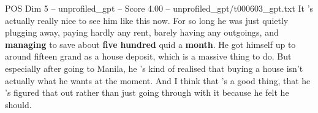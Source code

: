 \begin{textsample}{POS Dim 5 – unprofiled\_gpt – Score 4.00 – unprofiled\_gpt/t000603\_gpt.txt}  \label{ex:f5_pos_035}
It 's actually really nice to see him like this now.
For so long he was just quietly plugging away, paying hardly any rent, barely having any outgoings, and \textbf{managing} to save about \textbf{five} \textbf{hundred} quid a \textbf{month}.
He got himself up to around fifteen grand as a house deposit, which is a massive thing to do.
But especially after going to Manila, he ’s kind of realised that buying a house isn't actually what he wants at the moment.
And I think that ’s a good thing, that he ’s figured that out rather than just going through with it because he felt he should.

\end{textsample}
